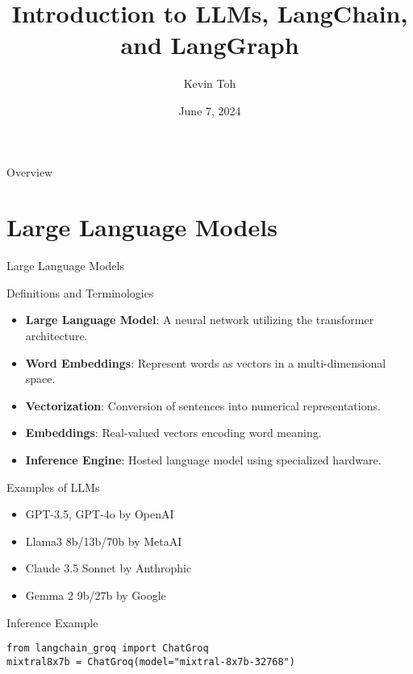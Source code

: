 \documentclass[aspectratio=169]{beamer}
\title{Introduction to LLMs, LangChain, and LangGraph}
\author{Kevin Toh}
\date{June 7, 2024}
\begin{document}
\begin{frame}
  \titlepage
\end{frame}

\begin{frame}{Overview}
  \tableofcontents
\end{frame}

\section{Large Language Models}

\begin{frame}{Large Language Models}
  \begin{block}{Definitions and Terminologies}
    \begin{itemize}
      \item \textbf{Large Language Model}: A neural network utilizing the transformer architecture.
      \item \textbf{Word Embeddings}: Represent words as vectors in a multi-dimensional space.
      \item \textbf{Vectorization}: Conversion of sentences into numerical representations.
      \item \textbf{Embeddings}: Real-valued vectors encoding word meaning.
      \item \textbf{Inference Engine}: Hosted language model using specialized hardware.
    \end{itemize}
  \end{block}
\end{frame}

\begin{frame}{Examples of LLMs}
  \begin{itemize}
    \item GPT-3.5, GPT-4o by OpenAI
    \item Llama3 8b/13b/70b by MetaAI
    \item Claude 3.5 Sonnet by Anthrophic
    \item Gemma 2 9b/27b by Google
  \end{itemize}
\end{frame}

\begin{frame}[fragile]{Inference Example}
\begin{verbatim}
from langchain_groq import ChatGroq
mixtral8x7b = ChatGroq(model="mixtral-8x7b-32768")
\end{verbatim}
\end{frame}
\end{document}
